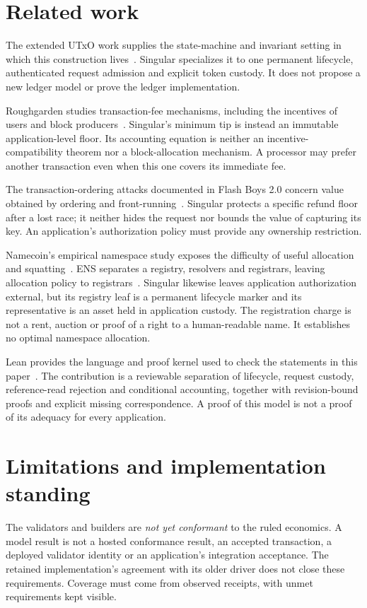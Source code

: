 \documentclass[runningheads]{llncs}
\begin{document}




\section{Related work}
The extended UTxO work supplies the state-machine and invariant setting in which
this construction lives~\cite{ExtendedUTXO20}. Singular specializes it to one
permanent lifecycle, authenticated request admission and explicit token custody.
It does not propose a new ledger model or prove the ledger implementation.

Roughgarden studies transaction-fee mechanisms, including the incentives of
users and block producers~\cite{Roughgarden21}. Singular's minimum tip is instead
an immutable application-level floor. Its accounting equation is neither an
incentive-compatibility theorem nor a block-allocation mechanism. A processor
may prefer another transaction even when this one covers its immediate fee.

The transaction-ordering attacks documented in Flash Boys 2.0 concern value
obtained by ordering and front-running~\cite{FlashBoys19}. Singular protects a
specific refund floor after a lost race; it neither hides the request nor
bounds the value of capturing its key. An application's authorization policy
must provide any ownership restriction.

Namecoin's empirical namespace study exposes the difficulty of useful allocation
and squatting~\cite{Namecoin15}. ENS separates a registry, resolvers and
registrars, leaving allocation policy to registrars~\cite{EIP137}. Singular
likewise leaves application authorization external, but its registry leaf is a
permanent lifecycle marker and its representative is an asset held in application
custody. The registration charge is not a rent, auction or proof of a right to a
human-readable name. It establishes no optimal namespace allocation.

Lean provides the language and proof kernel used to check the statements
in this paper~\cite{Lean4}. The contribution is a reviewable separation of lifecycle,
request custody, reference-read rejection and conditional accounting, together
with revision-bound proofs and explicit missing correspondence. A proof of this
model is not a proof of its adequacy for every application.

\section{Limitations and implementation standing}
The validators and builders are \emph{not yet conformant} to the ruled economics.
A model result is not a hosted conformance result, an accepted transaction,
a deployed validator identity or an application's integration acceptance.
The retained implementation's agreement with its older driver does not close
these requirements. Coverage must come from observed receipts, with unmet
requirements kept visible.
\end{document}
